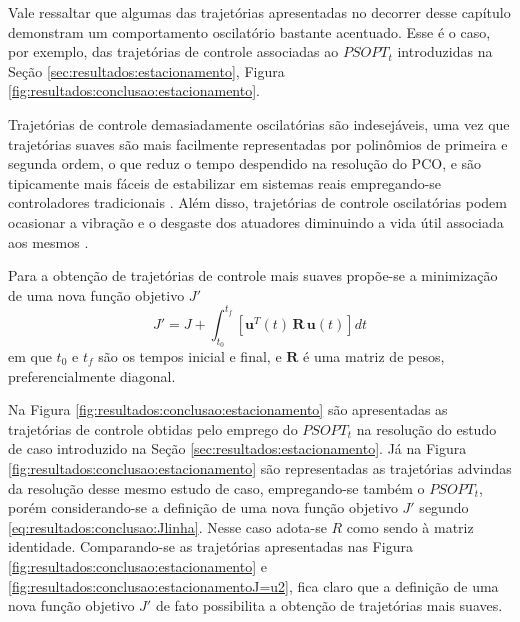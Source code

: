 
Vale ressaltar que algumas das trajetórias apresentadas no decorrer desse capítulo demonstram um comportamento oscilatório bastante acentuado. Esse é o caso, por exemplo, das trajetórias de controle associadas ao $ PSOPT_t $ introduzidas na Seção \ref{sec:resultados:estacionamento}, Figura \ref{fig:resultados:conclusao:estacionamento}.

Trajetórias de controle demasiadamente oscilatórias são indesejáveis, uma vez que trajetórias suaves são mais facilmente representadas por polinômios de primeira e segunda ordem, o que reduz o tempo despendido na resolução do PCO, e são tipicamente mais fáceis de estabilizar em sistemas reais empregando-se controladores tradicionais  \cite{kelly_introduction_2017}. Além disso, trajetórias de controle oscilatórias podem ocasionar a vibração e o desgaste dos atuadores diminuindo a vida útil associada aos mesmos \cite{livne_effects_2010}.

Para a obtenção de trajetórias de controle mais suaves propõe-se a minimização de uma nova função objetivo $ J' $
%
\begin{equation}
\label{eq:resultados:conclusao:Jlinha}
J' = J + \int_{t_0}^{t_f} \left[ \mathbf{u}^T(t) \, \mathbf{R} \, \mathbf{u}(t) \right] dt
\end{equation}
%
em que $ t_0 $ e $ t_f $ são os tempos inicial e final, e $ \mathbf{R} $ é uma matriz de pesos, preferencialmente diagonal. 

Na Figura \ref{fig:resultados:conclusao:estacionamento} são apresentadas as trajetórias de controle obtidas pelo emprego do $ PSOPT_t $ na resolução do estudo de caso introduzido na Seção \ref{sec:resultados:estacionamento}. Já na Figura \ref{fig:resultados:conclusao:estacionamento} são representadas as trajetórias advindas da resolução desse mesmo estudo de caso, empregando-se também o $ PSOPT_t $, porém considerando-se a definição de uma nova função objetivo $ J' $ segundo \eqref{eq:resultados:conclusao:Jlinha}. Nesse caso adota-se $ R $ como sendo à matriz identidade. Comparando-se as trajetórias apresentadas nas Figura  \ref{fig:resultados:conclusao:estacionamento} e  \ref{fig:resultados:conclusao:estacionamentoJ=u2}, fica claro que a definição de uma nova função objetivo $ J' $ de fato possibilita a obtenção de trajetórias mais suaves. 


